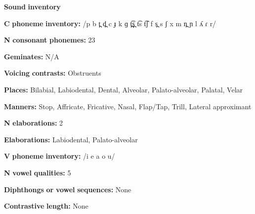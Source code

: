 \begin{styleBody}
\textbf{Sound} \textbf{inventory}
\end{styleBody}

\begin{styleBody}
\textbf{C} \textbf{phoneme} \textbf{inventory:} /p b t̪ d̪ c ɟ k ɡ t̪͡s̪ t͡s t͡ʃ f s̪ s ʃ x m n̪ ɲ l ʎ ɾ r/
\end{styleBody}

\begin{styleBody}
\textbf{N} \textbf{consonant} \textbf{phonemes:} 23
\end{styleBody}

\begin{styleBody}
\textbf{Geminates:} N/A
\end{styleBody}

\begin{styleBody}
\textbf{Voicing} \textbf{contrasts:} Obstruents
\end{styleBody}

\begin{styleBody}
\textbf{Places:} Bilabial, Labiodental, Dental, Alveolar, Palato-alveolar, Palatal, Velar
\end{styleBody}

\begin{styleBody}
\textbf{Manners:} Stop, Affricate, Fricative, Nasal, Flap/Tap, Trill, Lateral approximant
\end{styleBody}

\begin{styleBody}
\textbf{N} \textbf{elaborations:} 2
\end{styleBody}

\begin{styleBody}
\textbf{Elaborations:} Labiodental, Palato-alveolar
\end{styleBody}

\begin{styleBody}
\textbf{V} \textbf{phoneme} \textbf{inventory:} /i e a o u/
\end{styleBody}

\begin{styleBody}
\textbf{N} \textbf{vowel} \textbf{qualities:} 5
\end{styleBody}

\begin{styleBody}
\textbf{Diphthongs} \textbf{or} \textbf{vowel} \textbf{sequences:} None
\end{styleBody}

\begin{styleBody}
\textbf{Contrastive} \textbf{length:} None
\end{styleBody}

